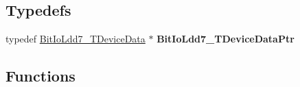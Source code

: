 \subsection*{Typedefs}
\begin{DoxyCompactItemize}
\item 
\hypertarget{group___bit_io_ldd7__module_ga42ed289439d061d65af4bf7a476285a8}{typedef \hyperlink{struct_bit_io_ldd7___t_device_data}{Bit\-Io\-Ldd7\-\_\-\-T\-Device\-Data} $\ast$ {\bfseries Bit\-Io\-Ldd7\-\_\-\-T\-Device\-Data\-Ptr}}\label{group___bit_io_ldd7__module_ga42ed289439d061d65af4bf7a476285a8}

\end{DoxyCompactItemize}
\subsection*{Functions}
